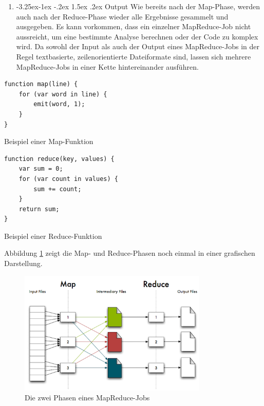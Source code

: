 \documentclass[a4paper]{article}
\makeatletter
\renewcommand\paragraph{\@startsection{paragraph}{4}{\z@}%
  {-3.25ex\@plus -1ex \@minus -.2ex}%
  {1.5ex \@plus .2ex}%
  {\normalfont\normalsize\bfseries}}
\makeatother
\begin{document}
\begin{enumerate}
    \item \paragraph{Output}
Wie bereits nach der Map-Phase, werden auch nach der Reduce-Phase wieder alle Ergebnisse gesammelt und ausgegeben. Es kann vorkommen, dass ein einzelner MapReduce-Job nicht aussreicht, um eine bestimmte Analyse berechnen oder der Code zu komplex wird. Da sowohl der Input als auch der Output eines MapReduce-Jobs in der Regel textbasierte, zeilenorientierte Dateiformate sind, lassen sich mehrere MapReduce-Jobs in einer Kette hintereinander ausführen.
\end{enumerate}

\begin{listing}[H]
\begin{verbatim}
function map(line) {
    for (var word in line) {
        emit(word, 1);
    }
}
\end{verbatim}
\caption{Beispiel einer Map-Funktion}
\label{lst:map}
\end{listing}

\begin{listing}[H]
\begin{verbatim}
function reduce(key, values) {
    var sum = 0;
    for (var count in values) {
        sum += count;
    }
    return sum;
}
\end{verbatim}
\caption{Beispiel einer Reduce-Funktion}
\label{lst:reduce}
\end{listing}

\newpage
Abbildung \ref{fig:mapreduce} zeigt die Map- und Reduce-Phasen noch einmal in einer grafischen Darstellung.

\begin{figure}[H]
\centering
\includegraphics[width=0.8\textwidth]{mapreduce.png}
\caption{Die zwei Phasen eines MapReduce-Jobs \protect\cite{GARFINKEL}}
\label{fig:mapreduce}
\end{figure}
\end{document}

